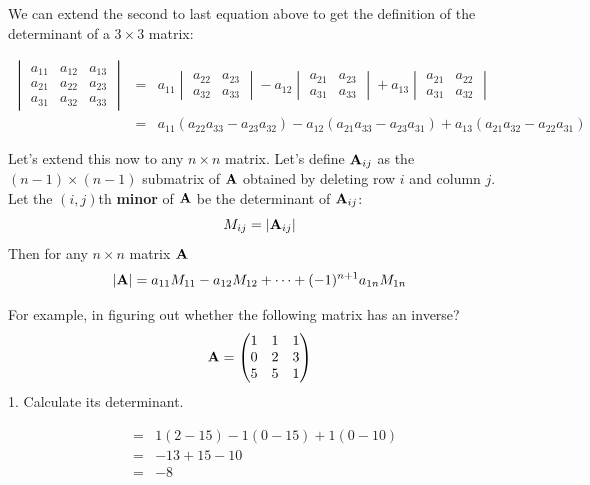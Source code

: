 \documentclass[]{book}
\theoremstyle{definition}
\theoremstyle{definition}
\theoremstyle{definition}
\theoremstyle{remark}
\begin{document}
We can extend the second to last equation above to get the definition of
the determinant of a \(3 \times 3\) matrix:

\begin{eqnarray*}
            \begin{vmatrix} a_{11}&a_{12}&a_{13}\\  a_{21} & a_{22}&a_{23}\\ a_{31}&a_{32}&a_{33} \end{vmatrix} 
                &=& 
                a_{11} \begin{vmatrix} a_{22}&a_{23}\\ a_{32}&a_{33} \end{vmatrix}
                - a_{12} \begin{vmatrix} a_{21}&a_{23}\\ a_{31}&a_{33} \end{vmatrix}
                + a_{13} \begin{vmatrix} a_{21}&a_{22}\\ a_{31}&a_{32} 
                \end{vmatrix}\\
                &=& a_{11}(a_{22}a_{33} - a_{23}a_{32}) - a_{12}(a_{21}a_{33} - a_{23}a_{31}) + a_{13}(a_{21}a_{32} - a_{22}a_{31})
\end{eqnarray*}

Let's extend this now to any \(n\times n\) matrix. Let's define
\({\bf A}_{ij}\) as the \((n-1)\times (n-1)\) submatrix of \({\bf A}\)
obtained by deleting row \(i\) and column \(j\). Let the \((i,j)\)th
\textbf{minor} of \({\bf A}\) be the determinant of \({\bf A}_{ij}\):
\[M_{ij}=|{\bf A}_{ij}|\] Then for any \(n\times n\) matrix \({\bf A}\)
\[|{\bf A}|= a_{11}M_{11} - a_{12}M_{12} + \cdots + (-1)^{n+1} a_{1n} M_{1n}\]

For example, in figuring out whether the following matrix has an
inverse? \[{\bf A}=\begin{pmatrix} 1&1&1\\0&2&3\\5&5&1 \end{pmatrix}\]
1. Calculate its determinant.

\begin{eqnarray}
                &=& 1(2-15) - 1(0-15) + 1(0-10) \nonumber\\
                &=& -13+15-10 \nonumber\\
                &=& -8\nonumber
\end{eqnarray}
\end{document}
